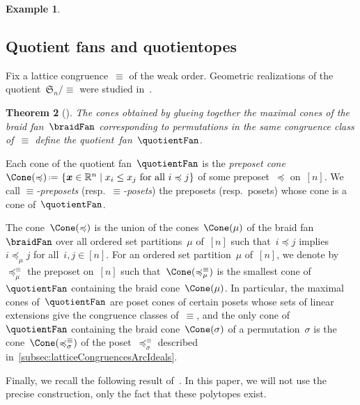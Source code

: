 \documentclass{amsart}
\newtheorem{theorem}{Theorem}[section]
\theoremstyle{definition}
\newtheorem{example}[theorem]{Example}
\newcommand{\R}{\mathbb{R}} %
\newcommand{\f}[1]{{\mathfrak{#1}}} %
\renewcommand{\b}[1]{{\boldsymbol{#1}}} %
\newcommand{\set}[2]{\left\{ #1 \;\middle|\; #2 \right\}} %
\newcommand{\eqdef}{\mbox{\,\raisebox{0.2ex}{\scriptsize\ensuremath{\mathrm:}}\ensuremath{=}\,}} %
\newcommand{\darkblue}{\color{darkblue}} %
\newcommand{\defn}[1]{\textsl{\darkblue #1}} %
\begin{document}
\begin{example}
\begin{figure}

\end{figure}
\end{example}


\subsection{Quotient fans and quotientopes}
\label{subsec:quotientFansQuotientopes}

Fix a lattice congruence~$\equiv$ of the weak order.
Geometric realizations of the quotient~$\f{S}_n / {\equiv}$ were studied in~\cite{Reading-HopfAlgebras, PilaudSantos-quotientopes, PadrolPilaudRitter}.

\begin{theorem}[\cite{Reading-HopfAlgebras}]
The cones obtained by glueing together the maximal cones of the braid fan~$\braidFan$ corresponding to permutations in the same congruence class of~$\equiv$ define the \defn{quotient~fan}~$\quotientFan$.
\end{theorem}

Each cone of the quotient fan~$\quotientFan$ is the \defn{preposet cone} $\Cone({\preccurlyeq}) \eqdef \set{\b{x} \in \R^n}{x_i \le x_j \text{ for all } i \preccurlyeq j}$ of some preposet~$\preccurlyeq$ on~$[n]$.
We call \defn{$\equiv$-preposets} (resp.~\defn{$\equiv$-posets}) the preposets (resp.~posets) whose cone is a cone of~$\quotientFan$.

The cone~$\Cone(\preccurlyeq)$ is the union of the cones~$\Cone(\mu)$ of the braid fan~$\braidFan$ over all ordered set partitions~$\mu$ of~$[n]$ such that~$i \preccurlyeq j$ implies $i \preccurlyeq_\mu j$ for all~$i,j \in [n]$.
For an ordered set partition~$\mu$ of~$[n]$, we denote by~$\preccurlyeq^\equiv_\mu$ the preposet on~$[n]$ such that~$\Cone(\preccurlyeq^\equiv_\mu)$ is the smallest cone of~$\quotientFan$ containing the braid cone~$\Cone(\mu)$.
In particular, the maximal cones of~$\quotientFan$ are poset cones of certain posets whose sets of linear extensions give the congruence classes of~$\equiv$, and the only cone of~$\quotientFan$ containing the braid cone~$\Cone(\sigma)$ of a permutation~$\sigma$ is the cone~$\Cone(\preccurlyeq^\equiv_\sigma)$ of the poset~$\preccurlyeq^\equiv_\sigma$ described in~\cref{subsec:latticeCongruencesArcIdeals}.

Finally, we recall the following result of~\cite{PilaudSantos-quotientopes, PadrolPilaudRitter}.
In this paper, we will not use the precise construction, only the fact that these polytopes exist.
\end{document}
